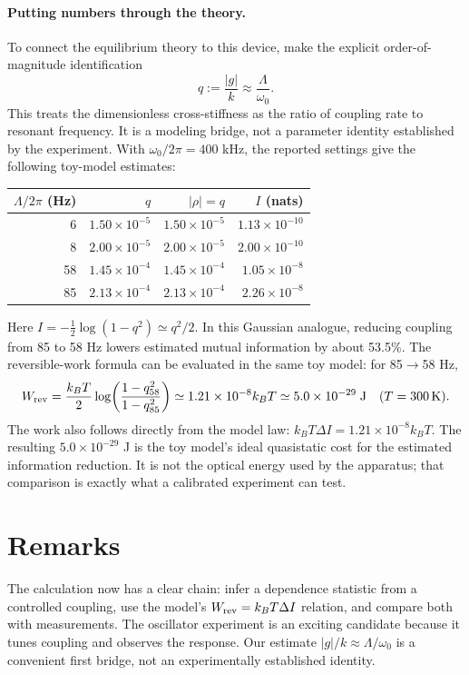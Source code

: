 \documentclass[9pt]{article}
\begin{document}
\paragraph{Putting numbers through the theory.} To connect the equilibrium theory to this device, make the explicit order-of-magnitude identification
\begin{equation}
 q:=\frac{|g|}{k}\approx\frac{\Lambda}{\omega_0}.
\end{equation}
This treats the dimensionless cross-stiffness as the ratio of coupling rate to resonant frequency. It is a modeling bridge, not a parameter identity established by the experiment. With $\omega_0/2\pi=400$ kHz, the reported settings give the following toy-model estimates:
\begin{center}
\begin{tabular}{rrrr}
\toprule
$\Lambda/2\pi$ (Hz) & $q$ & $|\rho|=q$ & $I$ (nats)\\
\midrule
6  & $1.50\times10^{-5}$ & $1.50\times10^{-5}$ & $1.13\times10^{-10}$\\
8  & $2.00\times10^{-5}$ & $2.00\times10^{-5}$ & $2.00\times10^{-10}$\\
58 & $1.45\times10^{-4}$ & $1.45\times10^{-4}$ & $1.05\times10^{-8}$\\
85 & $2.13\times10^{-4}$ & $2.13\times10^{-4}$ & $2.26\times10^{-8}$\\
\bottomrule
\end{tabular}
\end{center}
Here $I=-\frac12\log(1-q^2)\simeq q^2/2$. In this Gaussian analogue, reducing coupling from 85 to 58 Hz lowers estimated mutual information by about 53.5\%. The reversible-work formula can be evaluated in the same toy model: for 85$\to$58 Hz,
\begin{equation}
 W_{\rm rev}=\frac{k_BT}{2}\log\!\left(\frac{1-q_{58}^2}{1-q_{85}^2}\right)\simeq1.21\times10^{-8}k_BT\simeq5.0\times10^{-29}\;\mathrm{J}\quad(T=300\,\mathrm{K}).
\end{equation}
The work also follows directly from the model law: $k_BT\Delta I=1.21\times10^{-8}k_BT$. The resulting $5.0\times10^{-29}$ J is the toy model's ideal quasistatic cost for the estimated information reduction. It is not the optical energy used by the apparatus; that comparison is exactly what a calibrated experiment can test.

\section{Remarks}
The calculation now has a clear chain: infer a dependence statistic from a controlled coupling, use the model's $W_{\rm rev}=k_BT\Delta I$ relation, and compare both with measurements.\cite{sagawa2010,parrondo2015} The oscillator experiment is an exciting candidate because it tunes coupling and observes the response. Our estimate $|g|/k\approx\Lambda/\omega_0$ is a convenient first bridge, not an experimentally established identity.
\end{document}
